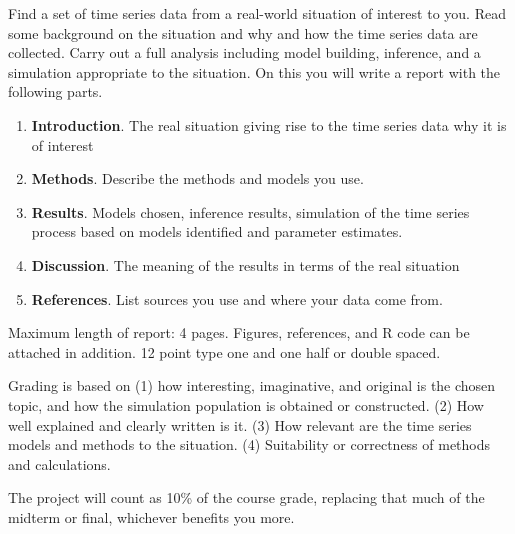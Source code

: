 \documentclass[12pt]{article}
\begin{document}
Find a set of time series data from a real-world situation of interest to you. Read some background on the situation and why and how the time series data are collected. Carry out a full analysis including model building, inference, and a simulation appropriate to the situation. On this you will write a report with the following parts.

\begin{enumerate}
\item \textbf{Introduction}. The real situation giving rise to the time series data why it is of interest
\item \textbf{Methods}. Describe the methods and models you use.
\item \textbf{Results}. Models chosen, inference results, simulation of the time series process based on models identified and parameter estimates.
\item \textbf{Discussion}. The meaning of the results in terms of the real situation
\item \textbf{References}. List sources you use and where your data come from.
\end{enumerate}

Maximum length of report: 4 pages. Figures, references, and R code can be attached in addition. 12 point type one and one half or double spaced.

Grading is based on (1) how interesting, imaginative, and original is the chosen topic, and how the simulation population is obtained or constructed. (2) How well explained and clearly written is it. (3) How relevant are the time series models and methods to the situation. (4) Suitability or correctness of methods and calculations.

The project will count as 10\% of the course grade, replacing that much of the midterm or final, whichever benefits you more.
\end{document}
